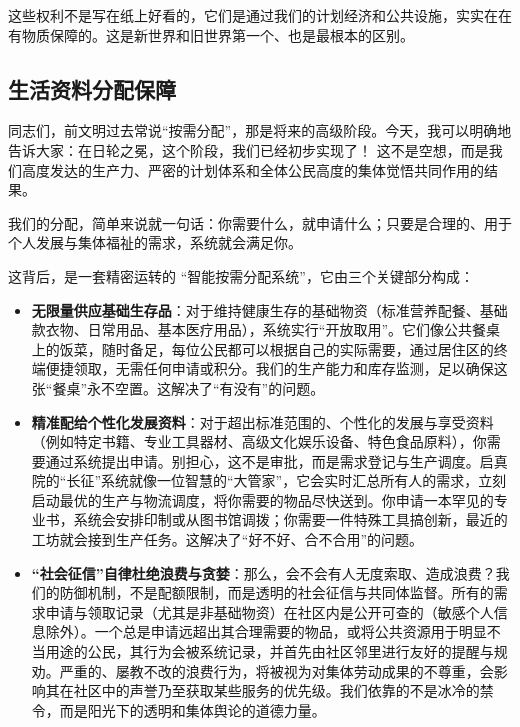 这些权利不是写在纸上好看的，它们是通过我们的计划经济和公共设施，实实在在有物质保障的。这是新世界和旧世界第一个、也是最根本的区别。

\subsection{生活资料分配保障}\label{ux751fux6d3bux8d44ux6599ux5206ux914dux4fddux969c}

同志们，前文明过去常说``按需分配''，那是将来的高级阶段。今天，我可以明确地告诉大家：在日轮之冕，这个阶段，我们已经初步实现了！ 这不是空想，而是我们高度发达的生产力、严密的计划体系和全体公民高度的集体觉悟共同作用的结果。

我们的分配，简单来说就一句话：你需要什么，就申请什么；只要是合理的、用于个人发展与集体福祉的需求，系统就会满足你。

这背后，是一套精密运转的 ``智能按需分配系统''，它由三个关键部分构成：

\begin{itemize}
\item
  \textbf{无限量供应基础生存品}：对于维持健康生存的基础物资（标准营养配餐、基础款衣物、日常用品、基本医疗用品），系统实行``开放取用''。它们像公共餐桌上的饭菜，随时备足，每位公民都可以根据自己的实际需要，通过居住区的终端便捷领取，无需任何申请或积分。我们的生产能力和库存监测，足以确保这张``餐桌''永不空置。这解决了``有没有''的问题。
\item
  \textbf{精准配给个性化发展资料}：对于超出标准范围的、个性化的发展与享受资料（例如特定书籍、专业工具器材、高级文化娱乐设备、特色食品原料），你需要通过系统提出申请。别担心，这不是审批，而是需求登记与生产调度。启真院的``长征''系统就像一位智慧的``大管家''，它会实时汇总所有人的需求，立刻启动最优的生产与物流调度，将你需要的物品尽快送到。你申请一本罕见的专业书，系统会安排印制或从图书馆调拨；你需要一件特殊工具搞创新，最近的工坊就会接到生产任务。这解决了``好不好、合不合用''的问题。
\item
  \textbf{``社会征信''自律杜绝浪费与贪婪}：那么，会不会有人无度索取、造成浪费？我们的防御机制，不是配额限制，而是透明的社会征信与共同体监督。所有的需求申请与领取记录（尤其是非基础物资）在社区内是公开可查的（敏感个人信息除外）。一个总是申请远超出其合理需要的物品，或将公共资源用于明显不当用途的公民，其行为会被系统记录，并首先由社区邻里进行友好的提醒与规劝。严重的、屡教不改的浪费行为，将被视为对集体劳动成果的不尊重，会影响其在社区中的声誉乃至获取某些服务的优先级。我们依靠的不是冰冷的禁令，而是阳光下的透明和集体舆论的道德力量。
\end{itemize}

